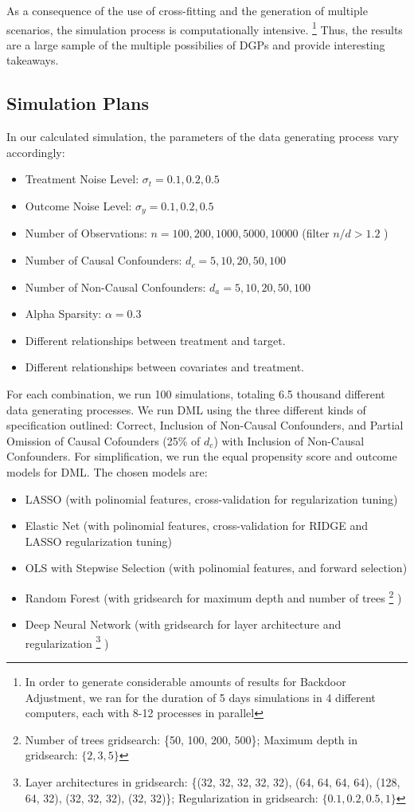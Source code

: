 \documentclass{article}
\numberwithin{equation}{section}
\begin{document}
As a consequence of the use of cross-fitting and the generation of multiple scenarios, the simulation process is computationally intensive. \footnote{In order to generate considerable amounts of results for Backdoor Adjustment, we ran for the duration of 5 days simulations in 4 different computers, each with 8-12 processes in parallel} Thus, the results are a large sample of the multiple possibilies of DGPs and provide interesting takeaways.

\subsection{Simulation Plans}

In our calculated simulation, the parameters of the data generating process vary accordingly:
\begin{itemize}
    \item Treatment Noise Level: $\sigma_t = 0.1, 0.2, 0.5$
    \item Outcome Noise Level: $\sigma_y = 0.1, 0.2, 0.5$
    \item Number of Observations: $n = 100, 200, 1000, 5000, 10000$ (filter $n / d > 1.2$ )
    \item Number of Causal Confounders: $d_c = 5, 10, 20, 50, 100$
    \item Number of Non-Causal Confounders: $d_a = 5, 10, 20, 50, 100$
    \item Alpha Sparsity: $\alpha = 0.3$
    \item Different relationships between treatment and target.
    \item Different relationships between covariates and treatment.
\end{itemize}

For each combination, we run 100 simulations, totaling 6.5 thousand different data generating processes. We run DML using the three different kinds of specification outlined: Correct, Inclusion of Non-Causal Confounders, and Partial Omission of Causal Cofounders (25\% of $d_c$) with Inclusion of Non-Causal Confounders. For simplification, we run the equal propensity score and outcome models for DML. The chosen models are:

\begin{itemize}
    \item LASSO (with polinomial features, cross-validation for regularization tuning)
    \item Elastic Net (with polinomial features, cross-validation for RIDGE and LASSO regularization tuning)
    \item OLS with Stepwise Selection (with polinomial features, and forward selection)
    \item Random Forest (with gridsearch for maximum depth and number of trees
    \footnote{Number of trees gridsearch: \{50, 100, 200, 500\}; Maximum depth in gridsearch: $\{2, 3, 5\}$}
    )
    \item Deep Neural Network (with gridsearch for layer architecture and regularization
    \footnote{Layer architectures in gridsearch: \{(32, 32, 32, 32, 32), (64, 64, 64, 64), (128, 64, 32), (32, 32, 32), (32, 32)\}; Regularization in gridsearch: $\{0.1, 0.2, 0.5, 1\}$}
    )
\end{itemize}
\end{document}
